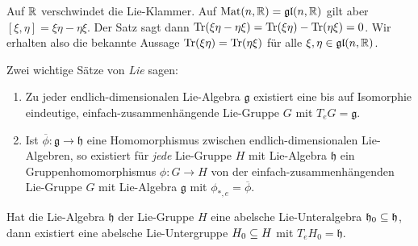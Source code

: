 Auf $\mathbb{R}$ verschwindet die Lie-Klammer. Auf $\text{Mat}(n, \mathbb{R})=\mathfrak{gl}(n, \mathbb{R})$ gilt aber $[\xi, \eta] = \xi \eta - \eta \xi$. Der Satz sagt dann $\Tr(\xi \eta - \eta \xi)=\Tr (\xi \eta) - \Tr (\eta \xi)=0$. Wir erhalten also die bekannte Aussage $\Tr (\xi \eta) = \Tr (\eta \xi)$ für alle $\xi, \eta \in \mathfrak{gl}(n, \mathbb{R})$.
\begin{bemerkungen}
Zwei wichtige Sätze von \emph{Lie} sagen:
\begin{enumerate}
\item Zu jeder endlich-dimensionalen Lie-Algebra $\mathfrak{g}$ existiert eine bis auf Isomorphie eindeutige, einfach-zusammenhängende Lie-Gruppe $G$ mit $T_eG=\mathfrak{g}$.
\item Ist $\overline{\phi}: \mathfrak{g} \to \mathfrak{h}$ eine Homomorphismus zwischen endlich-dimensionalen Lie-Algebren, so existiert für \textit{jede} Lie-Gruppe $H$ mit Lie-Algebra $\mathfrak{h}$ ein Gruppenhomomorphismus $\phi: G \to H$ von der einfach-zusammenhängenden Lie-Gruppe $G$ mit Lie-Algebra $\mathfrak{g}$ mit $\phi_{\ast, e} = \overline{\phi}$.
\end{enumerate}
\end{bemerkungen}
\begin{beispiel}
Hat die Lie-Algebra $\mathfrak{h}$ der Lie-Gruppe $H$ eine abelsche Lie-Unteralgebra $\mathfrak{h}_0 \subseteq \mathfrak{h}$, dann existiert eine abelsche Lie-Untergruppe $H_0 \subseteq H$ mit $T_eH_0 = \mathfrak{h}$.
\end{beispiel}
